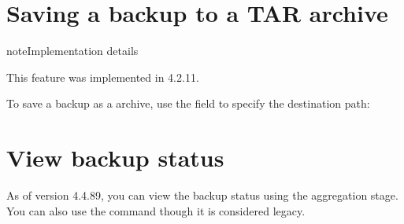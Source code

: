 \documentclass[letterpaper,10pt,english]{sphinxmanual}
\begin{document}
\begin{sphinxVerbatim}[commandchars=\\\{\}]
\end{sphinxVerbatim}


\section{Saving a backup to a TAR archive}
\label{\detokenize{hot-backup:saving-a-backup-to-a-tar-archive}}
\begin{sphinxadmonition}{note}{Implementation details}

\sphinxAtStartPar
This feature was implemented in  4.2.1\sphinxhyphen{}1.
\end{sphinxadmonition}

\sphinxAtStartPar
To save a backup as a  archive, use the  field to
specify the destination path:

\begin{sphinxVerbatim}[commandchars=\\\{\}]
\end{sphinxVerbatim}


\section{View backup status}
\label{\detokenize{hot-backup:view-backup-status}}
\sphinxAtStartPar
As of version 4.4.8\sphinxhyphen{}9, you can view the backup status using the  aggregation stage. You can also use the  command though it is considered legacy.
\end{document}
